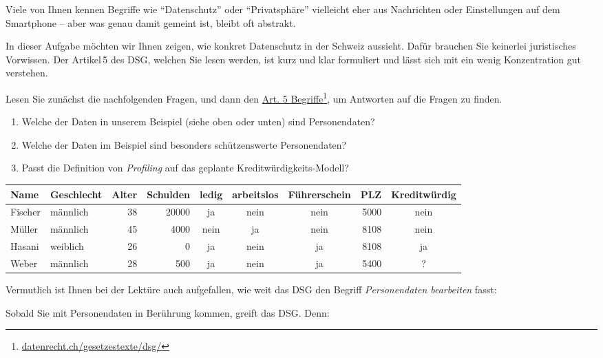 \begin{lpu}
Viele von Ihnen kennen Begriffe wie ``Datenschutz'' oder ``Privatsphäre'' vielleicht eher aus Nachrichten oder Einstellungen auf dem Smartphone – aber was genau damit gemeint ist, bleibt oft abstrakt.

In dieser Aufgabe möchten wir Ihnen zeigen, wie konkret Datenschutz in der Schweiz aussieht. Dafür brauchen Sie keinerlei juristisches Vorwissen. Der Artikel 5 des DSG, welchen Sie lesen werden, ist kurz und klar formuliert und lässt sich mit ein wenig Konzentration gut verstehen.

\begin{aufgabe}{2}
Lesen Sie zunächst die nachfolgenden Fragen, und dann den \href{https://datenrecht.ch/gesetzestexte/dsg/#id686591b1ad647}{Art. 5 Begriffe}\footnote{\href{https://datenrecht.ch/gesetzestexte/dsg/#id686591b1ad647}{\url{datenrecht.ch/gesetzestexte/dsg/}}}, um Antworten auf die Fragen zu finden. 

\begin{enumerate}
    \item Welche der Daten in unserem Beispiel (siehe oben oder unten) sind Personendaten?
    \item Welche der Daten im Beispiel sind besonders schützenswerte Personendaten?
    \item Passt die Definition von \textit{Profiling} auf das geplante Kreditwürdigkeits-Modell?
\end{enumerate}

\end{aufgabe}

\begin{table}[h]
\begin{tabularx}{0.6\textwidth}{|l|l|r|r|c|c|c|r|c|}
\hline
\textbf{Name} & \textbf{Geschlecht} & \textbf{Alter} & \textbf{Schulden} & \textbf{ledig} & \textbf{arbeitslos} & \textbf{Führerschein} & \textbf{PLZ} & \textbf{Kreditwürdig} \\
\hline
Fischer & männlich & 38 & 20000 & ja & nein & nein & 5000 & nein \\
Müller  & männlich & 45 & 4000  & nein & ja & nein & 8108 & nein \\
Hasani  & weiblich & 26 & 0     & ja & nein & ja & 8108 & ja \\
Weber   & männlich & 28 & 500   & ja & nein & ja & 5400 & \cellcolor{orange}? \\
\hline
\end{tabularx}
\end{table}

Vermutlich ist Ihnen bei der Lektüre auch aufgefallen, wie weit das DSG den Begriff \textit{Personendaten bearbeiten} fasst:
\begin{theorie}
    Sobald Sie mit Personendaten in Berührung kommen, greift das DSG. Denn:


\end{theorie}
\end{lpu}
